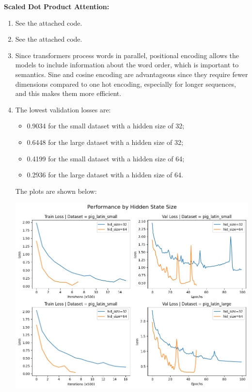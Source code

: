 \documentclass[12pt]{article}
\begin{document}
\textbf{Scaled Dot Product Attention:}
\begin{enumerate}
    \item See the attached code.
    \item See the attached code.
    \item Since transformers process words in parallel, positional encoding allows the models to include information about the word order, which is important to semantics. Sine and cosine encoding are advantageous since they require fewer dimensions compared to one hot encoding, especially for longer sequences, and this makes them more efficient.
    \item The lowest validation losses are:
    \begin{itemize}
        \item 0.9034 for the small dataset with a hidden size of 32;
        \item 0.6448 for the large dataset with a hidden size of 32;
        \item 0.4199 for the small dataset with a hidden size of 64;
        \item 0.2936 for the large dataset with a hidden size of 64.
    \end{itemize} The plots are shown below:
    \begin{center}
        \includegraphics[scale=.6]{2.1.4-1.png}

\end{center}
\end{enumerate}
\end{document}

